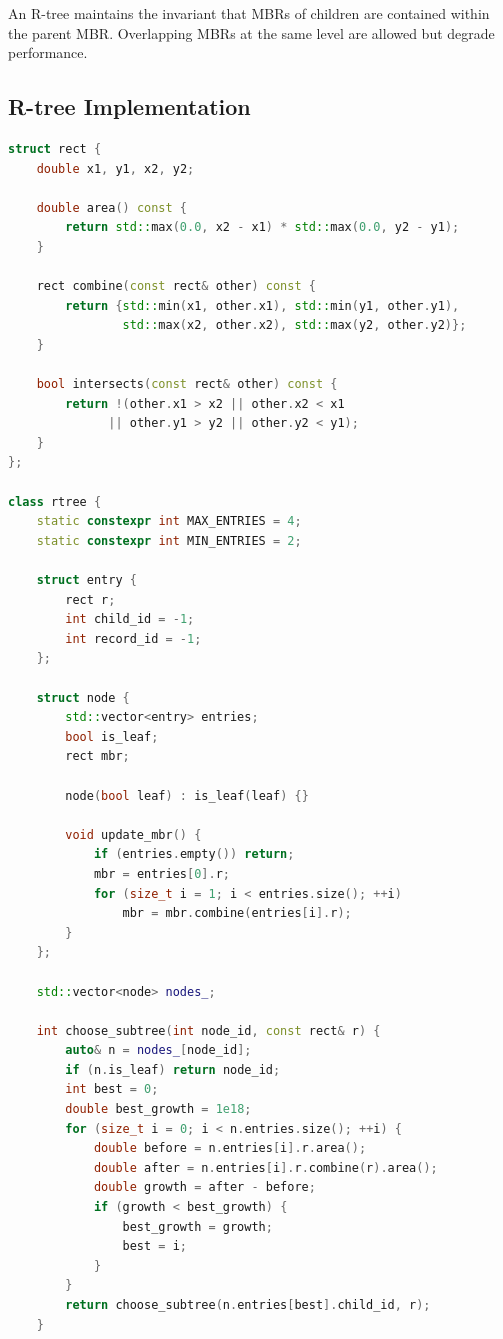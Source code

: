 An R-tree maintains the invariant that MBRs of children are contained within the parent MBR. Overlapping MBRs at the same level are allowed but degrade performance.

\subsection{R-tree Implementation}

\begin{lstlisting}[language=C++]
struct rect {
    double x1, y1, x2, y2;

    double area() const {
        return std::max(0.0, x2 - x1) * std::max(0.0, y2 - y1);
    }

    rect combine(const rect& other) const {
        return {std::min(x1, other.x1), std::min(y1, other.y1),
                std::max(x2, other.x2), std::max(y2, other.y2)};
    }

    bool intersects(const rect& other) const {
        return !(other.x1 > x2 || other.x2 < x1
              || other.y1 > y2 || other.y2 < y1);
    }
};

class rtree {
    static constexpr int MAX_ENTRIES = 4;
    static constexpr int MIN_ENTRIES = 2;

    struct entry {
        rect r;
        int child_id = -1;
        int record_id = -1;
    };

    struct node {
        std::vector<entry> entries;
        bool is_leaf;
        rect mbr;

        node(bool leaf) : is_leaf(leaf) {}

        void update_mbr() {
            if (entries.empty()) return;
            mbr = entries[0].r;
            for (size_t i = 1; i < entries.size(); ++i)
                mbr = mbr.combine(entries[i].r);
        }
    };

    std::vector<node> nodes_;

    int choose_subtree(int node_id, const rect& r) {
        auto& n = nodes_[node_id];
        if (n.is_leaf) return node_id;
        int best = 0;
        double best_growth = 1e18;
        for (size_t i = 0; i < n.entries.size(); ++i) {
            double before = n.entries[i].r.area();
            double after = n.entries[i].r.combine(r).area();
            double growth = after - before;
            if (growth < best_growth) {
                best_growth = growth;
                best = i;
            }
        }
        return choose_subtree(n.entries[best].child_id, r);
    }


\end{lstlisting}
